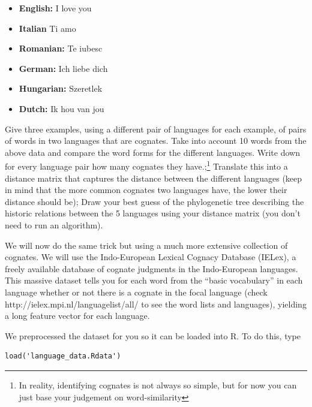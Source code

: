 \documentclass[a4paper, 9pt]{article}
\begin{document}
\begin{mdframed}
  \begin{itemize}[leftmargin=1em]
  \item \textbf{English:} I love you
  \item \textbf{Italian} Ti amo
  \item \textbf{Romanian:} Te iubesc
  \item \textbf{German:} Ich liebe dich
  \item \textbf{Hungarian:} Szeretlek
  \item \textbf{Dutch:} Ik hou van jou
  \end{itemize}
\end{mdframed}

\begin{exercise}
\askstar Give three examples, using a different pair of languages for each example, of pairs of words in two languages that are cognates.
\action Take into account 10 words from the above data and compare the word forms for the different languages. Write down for every language pair how many cognates they have.;\footnote{In reality, identifying cognates is not always so simple, but for now you can just base your judgement on word-similarity}
\askstar Translate this into a distance matrix that captures the distance between the different languages (keep in mind that the more common cognates two languages have, the lower their distance should be);
\action Draw your best guess of the phylogenetic tree describing the historic relations between the 5 languages using your distance matrix (you don't need to run an algorithm).
\end{exercise}

We will now do the same trick but using a much more extensive collection
of cognates. We will use the Indo-European Lexical Cognacy Database
(IELex), a freely available database of cognate judgments in the
Indo-European languages. This massive dataset tells you for each word
from the ``basic vocabulary'' in each language whether or not there is a
cognate in the focal language (check
http://ielex.mpi.nl/languagelist/all/ to see the word lists and
languages), yielding a long feature vector for each language.
\begin{exercise}
\action We preprocessed the dataset for you so it can be loaded into R. To do this, type
\begin{lstlisting}
load('language_data.Rdata')
\end{lstlisting}
\end{exercise}
\end{document}
